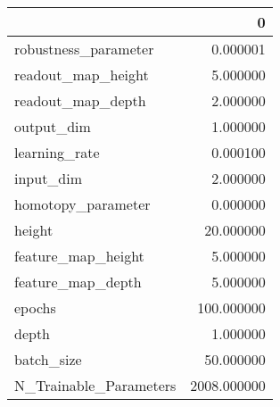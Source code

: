 \begin{tabular}{lr}
\toprule
{} &            0 \\
\midrule
robustness\_parameter   &     0.000001 \\
readout\_map\_height     &     5.000000 \\
readout\_map\_depth      &     2.000000 \\
output\_dim             &     1.000000 \\
learning\_rate          &     0.000100 \\
input\_dim              &     2.000000 \\
homotopy\_parameter     &     0.000000 \\
height                 &    20.000000 \\
feature\_map\_height     &     5.000000 \\
feature\_map\_depth      &     5.000000 \\
epochs                 &   100.000000 \\
depth                  &     1.000000 \\
batch\_size             &    50.000000 \\
N\_Trainable\_Parameters &  2008.000000 \\
\bottomrule
\end{tabular}
